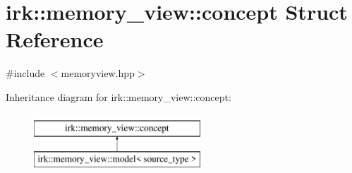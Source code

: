 \hypertarget{structirk_1_1memory__view_1_1concept}{}\section{irk\+:\+:memory\+\_\+view\+:\+:concept Struct Reference}
\label{structirk_1_1memory__view_1_1concept}


{\ttfamily \#include $<$memoryview.\+hpp$>$}

Inheritance diagram for irk\+:\+:memory\+\_\+view\+:\+:concept\+:\begin{figure}[H]
\begin{center}
\leavevmode
\includegraphics[height=2.000000cm]{structirk_1_1memory__view_1_1concept}
\end{center}
\end{figure}
